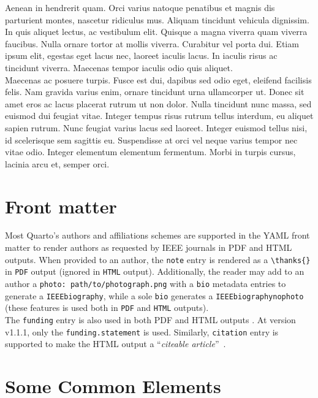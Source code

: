 \documentclass[
  journal,
]{IEEEtran}%
\theoremstyle{plain}
\theoremstyle{remark}
\begin{document}
Aenean in hendrerit quam. Orci varius natoque penatibus et magnis dis
parturient montes, nascetur ridiculus mus. Aliquam tincidunt vehicula
dignissim. In quis aliquet lectus, ac vestibulum elit. Quisque a magna
viverra quam viverra faucibus. Nulla ornare tortor at mollis viverra.
Curabitur vel porta dui. Etiam ipsum elit, egestas eget lacus nec,
laoreet iaculis lacus. In iaculis risus ac tincidunt viverra. Maecenas
tempor iaculis odio quis aliquet.\\
Maecenas ac posuere turpis. Fusce est dui, dapibus sed odio eget,
eleifend facilisis felis. Nam gravida varius enim, ornare tincidunt urna
ullamcorper ut. Donec sit amet eros ac lacus placerat rutrum ut non
dolor. Nulla tincidunt nunc massa, sed euismod dui feugiat vitae.
Integer tempus risus rutrum tellus interdum, eu aliquet sapien rutrum.
Nunc feugiat varius lacus sed laoreet. Integer euismod tellus nisi, id
scelerisque sem sagittis eu. Suspendisse at orci vel neque varius tempor
nec vitae odio. Integer elementum elementum fermentum. Morbi in turpis
cursus, lacinia arcu et, semper orci.

\section{Front matter}\label{front-matter}

Most Quarto's authors and affiliations schemes
 are supported in the YAML front
matter to render authors as requested by IEEE journals in PDF and HTML
outputs. When provided to an author, the \texttt{note} entry is rendered
as a \texttt{\textbackslash{}thanks\{\}} in \texttt{PDF} output (ignored
in \texttt{HTML} output). Additionally, the reader may add to an author
a \texttt{photo:\ path/to/photograph.png} with a \texttt{bio} metadata
entries to generate a \texttt{IEEEbiography}, while a sole \texttt{bio}
generates a \texttt{IEEEbiographynophoto} (these features is used both
in \texttt{PDF} and \texttt{HTML} outputs).\\
The \texttt{funding} entry is also used in both PDF and HTML outputs
. At version v1.1.1, only the
\texttt{funding.statement} is used. Similarly, \texttt{citation} entry
is supported to make the HTML output a ``\emph{citeable
article}''~.

\section{Some Common Elements}\label{some-common-elements}
\end{document}
